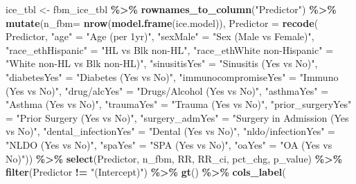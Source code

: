 \documentclass[
]{article}
\newenvironment{Shaded}{\begin{snugshade}}{\end{snugshade}}
\newcommand{\AttributeTok}[1]{\textcolor[rgb]{0.13,0.29,0.53}{#1}}
\newcommand{\FunctionTok}[1]{\textcolor[rgb]{0.13,0.29,0.53}{\textbf{#1}}}
\newcommand{\NormalTok}[1]{#1}
\newcommand{\OtherTok}[1]{\textcolor[rgb]{0.56,0.35,0.01}{#1}}
\newcommand{\SpecialCharTok}[1]{\textcolor[rgb]{0.81,0.36,0.00}{\textbf{#1}}}
\newcommand{\StringTok}[1]{\textcolor[rgb]{0.31,0.60,0.02}{#1}}
\begin{document}
\begin{Shaded}
\begin{Highlighting}[]
\NormalTok{ice\_tbl }\OtherTok{\textless{}{-}}\NormalTok{ fbm\_ice\_tbl }\SpecialCharTok{\%\textgreater{}\%}
  \FunctionTok{rownames\_to\_column}\NormalTok{(}\StringTok{"Predictor"}\NormalTok{) }\SpecialCharTok{\%\textgreater{}\%} 
  \FunctionTok{mutate}\NormalTok{(}\AttributeTok{n\_fbm=} \FunctionTok{nrow}\NormalTok{(}\FunctionTok{model.frame}\NormalTok{(ice.model)),}
      \AttributeTok{Predictor =} \FunctionTok{recode}\NormalTok{(}
\NormalTok{        Predictor,}
        \StringTok{"age"} \OtherTok{=} \StringTok{"Age (per 1yr)"}\NormalTok{,}
        \StringTok{"sexMale"} \OtherTok{=} \StringTok{"Sex (Male vs Female)"}\NormalTok{,}
        \StringTok{"race\_ethHispanic"} \OtherTok{=} \StringTok{"HL vs Blk non{-}HL"}\NormalTok{,}
        \StringTok{"race\_ethWhite non{-}Hispanic"} \OtherTok{=} \StringTok{"White non{-}HL vs Blk non{-}HL)"}\NormalTok{,}
        \StringTok{"sinusitisYes"} \OtherTok{=} \StringTok{"Sinusitis (Yes vs No)"}\NormalTok{,}
        \StringTok{"diabetesYes"} \OtherTok{=} \StringTok{"Diabetes (Yes vs No)"}\NormalTok{,}
        \StringTok{"immunocompromiseYes"} \OtherTok{=} \StringTok{"Immuno (Yes vs No)"}\NormalTok{,}
        \StringTok{"\textasciigrave{}drug/alc\textasciigrave{}Yes"} \OtherTok{=} \StringTok{"Drugs/Alcohol (Yes vs No)"}\NormalTok{,}
        \StringTok{"asthmaYes"} \OtherTok{=} \StringTok{"Asthma (Yes vs No)"}\NormalTok{,}
        \StringTok{"traumaYes"} \OtherTok{=} \StringTok{"Trauma (Yes vs No)"}\NormalTok{,}
        \StringTok{"prior\_surgeryYes"} \OtherTok{=} \StringTok{"Prior Surgery (Yes vs No)"}\NormalTok{,}
        \StringTok{"surgery\_admYes"} \OtherTok{=} \StringTok{"Surgery in Admission (Yes vs No)"}\NormalTok{,}
        \StringTok{"dental\_infectionYes"} \OtherTok{=} \StringTok{"Dental (Yes vs No)"}\NormalTok{,}
        \StringTok{"\textasciigrave{}nldo/infection\textasciigrave{}Yes"} \OtherTok{=} \StringTok{"NLDO (Yes vs No)"}\NormalTok{,}
        \StringTok{"spaYes"} \OtherTok{=} \StringTok{"SPA (Yes vs No)"}\NormalTok{,}
        \StringTok{"oaYes"} \OtherTok{=} \StringTok{"OA (Yes vs No)"}\NormalTok{)) }\SpecialCharTok{\%\textgreater{}\%} 
  \FunctionTok{select}\NormalTok{(Predictor, n\_fbm, RR, RR\_ci, pct\_chg, p\_value) }\SpecialCharTok{\%\textgreater{}\%}
  \FunctionTok{filter}\NormalTok{(Predictor }\SpecialCharTok{!=} \StringTok{"(Intercept)"}\NormalTok{) }\SpecialCharTok{\%\textgreater{}\%} 
  \FunctionTok{gt}\NormalTok{() }\SpecialCharTok{\%\textgreater{}\%}
  \FunctionTok{cols\_label}\NormalTok{(}

\end{Highlighting}
\end{Shaded}
\end{document}
